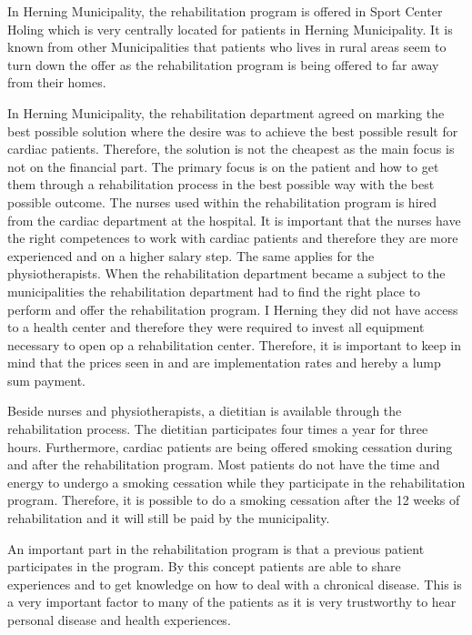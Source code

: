 In Herning Municipality, the rehabilitation program is offered in Sport Center Holing which is very centrally located for patients in Herning Municipality. It is known from other Municipalities that patients who lives in rural areas seem to turn down the offer as the rehabilitation program is being offered to far away from their homes. 

In Herning Municipality, the rehabilitation department agreed on marking the best possible solution where the desire was to achieve the best possible result for cardiac patients. Therefore, the solution is not the cheapest as the main focus is not on the financial part. The primary focus is on the patient and how to get them through a rehabilitation process in the best possible way with the best possible outcome. The nurses used within the rehabilitation program is hired from the cardiac department at the hospital. It is important that the nurses have the right competences to work with cardiac patients and therefore they are more experienced and on a higher salary step. The same applies for the physiotherapists. When the rehabilitation department became a subject to the municipalities the rehabilitation department had to find the right place to perform and offer the rehabilitation program. I Herning they did not have access to a health center and therefore they were required to invest all equipment necessary to open op a rehabilitation center. Therefore, it is important to keep in mind that the prices seen in  and  are implementation rates and hereby a lump sum payment.   

Beside nurses and physiotherapists, a dietitian is available through the rehabilitation process. The dietitian participates four times a year for three hours. Furthermore, cardiac patients are being offered smoking cessation during and after the rehabilitation program. Most patients do not have the time and energy to undergo a smoking cessation while they participate in the rehabilitation program. Therefore, it is possible to do a smoking cessation after the 12 weeks of rehabilitation and it will still be paid by the municipality.   

An important part in the rehabilitation program is that a previous patient participates in the program. By this concept patients are able to share experiences and to get knowledge on how to deal with a chronical disease. This is a very important factor to many of the patients as it is very trustworthy to hear personal disease and health experiences. 

